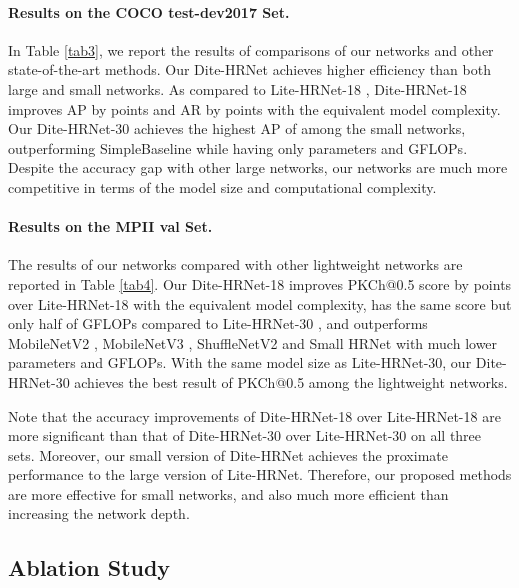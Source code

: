 \documentclass{article}
\begin{document}
\paragraph{Results on the COCO test-dev2017 Set.} In Table \ref{tab3}, we report the results of comparisons of our networks and other state-of-the-art methods. Our Dite-HRNet achieves higher efficiency than both large and small networks. As compared to Lite-HRNet-18 \cite{yu:litehrnet}, Dite-HRNet-18 improves AP by  points and AR by  points with the equivalent model complexity. Our Dite-HRNet-30 achieves the highest AP of  among the small networks, outperforming SimpleBaseline \cite{xiao:simple} while having only  parameters and  GFLOPs. Despite the accuracy gap with other large networks, our networks are much more competitive in terms of the model size and computational complexity.

\paragraph{Results on the MPII val Set.} The results of our networks compared with other lightweight networks are reported in Table \ref{tab4}. Our Dite-HRNet-18 improves PKCh@0.5 score by  points over Lite-HRNet-18 \cite{yu:litehrnet} with the equivalent model complexity, has the same score but only half of GFLOPs compared to Lite-HRNet-30 \cite{yu:litehrnet}, and outperforms MobileNetV2 \cite{sandler:mobile2}, MobileNetV3 \cite{howard:mobile3}, ShuffleNetV2 \cite{ma:shuffle2} and Small HRNet \cite{wang:smallhrnet} with much lower parameters and GFLOPs. With the same model size as Lite-HRNet-30, our Dite-HRNet-30 achieves the best result of  PKCh@0.5 among the lightweight networks.

Note that the accuracy improvements of Dite-HRNet-18 over Lite-HRNet-18 are more significant than that of Dite-HRNet-30 over Lite-HRNet-30 on all three sets. Moreover, our small version of Dite-HRNet achieves the proximate performance to the large version of Lite-HRNet. Therefore, our proposed methods are more effective for small networks, and also much more efficient than increasing the network depth.

\subsection{Ablation Study}
\end{document}
